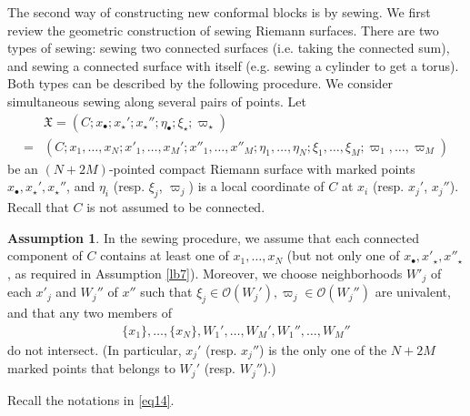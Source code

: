 \documentclass[11pt,b5paper,notitlepage]{article}
\theoremstyle{definition}
\newtheorem{ass}[df]{Assumption}
\theoremstyle{plain}
\newcommand{\fk}{\mathfrak}
\newcommand{\scr}{\mathscr}
\newcommand{\blt}{\bullet}
\numberwithin{equation}{section}
\begin{document}
The second way of constructing new conformal blocks is by sewing. We first review the geometric construction of sewing Riemann surfaces. There are two types of sewing: sewing two connected surfaces (i.e. taking the connected sum), and sewing a connected surface with itself (e.g. sewing a cylinder to get a torus). Both types can be described by the following procedure. We consider simultaneous sewing along several pairs of points. Let
\begin{align}\label{eq16}
&\fk X=(C;x_\blt;x_\star';x_\star'';\eta_\blt;\xi_\star;\varpi_\star)\nonumber\\
=&(C;x_1,\dots,x_N;x'_1,\dots,x_M';x''_1,\dots,x''_M;\eta_1,\dots,\eta_N;\xi_1,\dots,\xi_M;\varpi_1,\dots,\varpi_M)
\end{align}
be an $(N+2M)$-pointed compact Riemann surface with marked points $x_\blt,x_\star',x_\star''$, and $\eta_i$ (resp. $\xi_j$, $\varpi_j$) is a local coordinate of $C$ at $x_i$ (resp. $x_j'$, $x_j''$). Recall that $C$ is not assumed to be connected.


\begin{ass}\label{lb9}
In the sewing procedure, we assume that each connected component of $C$ contains at least one of $x_1,\dots,x_N$ (but not only one of $x_\blt,x'_\star,x''_\star$, as required in Assumption \ref{lb7}). Moreover, we choose neighborhoods $W'_j$ of each $x'_j$ and $W_j''$ of $x''$ such that $\xi_j\in\scr O(W_j'),\varpi_j\in\scr O(W_j'')$ are univalent, and that any two members of
\begin{align*}
\{x_1\},\dots,\{x_N\},W_1',\dots,W_M', W_1'',\dots,W_M''
\end{align*}
do not intersect. (In particular, $x_j'$ (resp. $x_j''$) is the only one of the $N+2M$ marked points that belongs to $W_j'$ (resp. $W_j''$).)
\end{ass}



Recall the notations in \eqref{eq14}.
\end{document}
